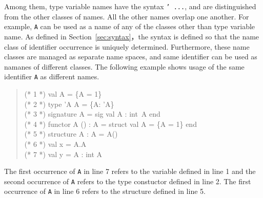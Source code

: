 \documentclass{jbook}
\newcommand{\code}[1]{\mbox{\large\tt #1}}
\newenvironment{program}{\begin{quote}\begin{tt}}%
                        {\end{tt}\end{quote}}
\begin{document}
	Among them, type variable names have the syntax
\code{' ...}, and are distinguished from the other classes of names.
	All the other names overlap one another.
	For example, \code{A} can be used as a name of any of the
classes other than type variable name.
	As defined in Section~\ref{sec:syntax}，the syntax is defined so
that the name class of identifier occurrence is uniquely determined.
	Furthermore, these name classes are managed as separate name spaces,
and same identifier can be used as namanes of different classes.
	The following example shows usage of the same identifier
\code{A} as different names.
\begin{program}
(* 1 *) val A = \{A = 1\}\\
(* 2 *) type 'A A =  \{A: 'A\}\\
(* 3 *) signature A = sig val A : int\ A end\\
(* 4 *) functor A () : A = struct val A = \{A = 1\} end\\
(* 5 *) structure A : A = A()\\
(* 6 *) val x = A.A\\
(* 7 *) val y = A : int A
\end{program}
	The first occurrence of \code{A} in line 7 refers to the variable defined in line 1
and the second occurrence of \code{A} refers to the type constuctor
defined in line 2.
	The first occurrence of \code{A} in line 6 refers to the
structure defined in line 5.
\end{document}
